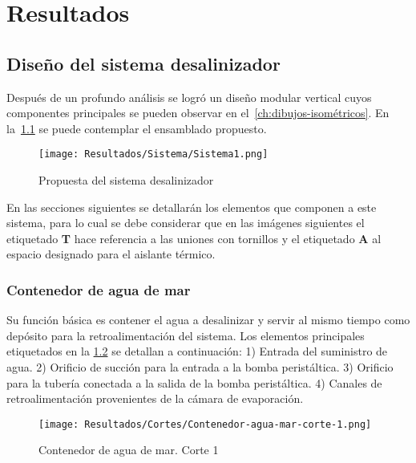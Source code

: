 \chapter{Resultados}
	
	\section{Diseño del sistema desalinizador}
		
		Después de un profundo análisis se logró un diseño modular vertical cuyos componentes principales se pueden observar en el~\cref{ch:dibujos-isométricos}. En la~\cref{fig:Sistema1} se puede contemplar el ensamblado propuesto.
		
		\begin{figure}[H]
			\centering
			\texttt{[image: Resultados/Sistema/Sistema1.png]}
			\caption{Propuesta del sistema desalinizador}
			\label{fig:Sistema1}
		\end{figure}
		
		En las secciones siguientes se detallarán los elementos que componen a este sistema, para lo cual se debe considerar que en las imágenes siguientes el etiquetado \textbf{T} hace referencia a las uniones con tornillos y el etiquetado \textbf{A} al espacio designado para el aislante térmico.
	
		\subsection{Contenedor de agua de mar}
			
			Su función básica es contener el agua a desalinizar y servir al mismo tiempo como depósito para la retroalimentación del sistema. Los elementos principales etiquetados en la \cref{fig:Contenedor-agua-mar-corte-1} se detallan a continuación: 1) Entrada del suministro de agua. 2) Orificio de succión para la entrada a la bomba peristáltica. 3) Orificio para la tubería conectada a la salida de la bomba peristáltica. 4) Canales de retroalimentación provenientes de la cámara de evaporación.
		
			\begin{figure}[H]
				\centering
				\texttt{[image: Resultados/Cortes/Contenedor-agua-mar-corte-1.png]}
				\caption{Contenedor de agua de mar. Corte 1}
				\label{fig:Contenedor-agua-mar-corte-1}
			\end{figure}
		
